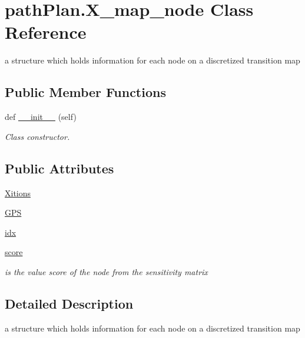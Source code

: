 \hypertarget{classpath_plan_1_1_x__map__node}{}\section{path\+Plan.\+X\+\_\+map\+\_\+node Class Reference}
\label{classpath_plan_1_1_x__map__node}


a structure which holds information for each node on a discretized transition map  


\subsection*{Public Member Functions}
\begin{DoxyCompactItemize}
\item 
def \mbox{\hyperlink{classpath_plan_1_1_x__map__node_ad8593e6f5daa3f094d7486fb158d76b3}{\+\_\+\+\_\+init\+\_\+\+\_\+}} (self)
\begin{DoxyCompactList}\small\item\em Class constructor. \end{DoxyCompactList}\end{DoxyCompactItemize}
\subsection*{Public Attributes}
\begin{DoxyCompactItemize}
\item 
\mbox{\hyperlink{classpath_plan_1_1_x__map__node_abcc46c0a97c98ba2dcf9499f36dc4a74}{Xitions}}
\item 
\mbox{\hyperlink{classpath_plan_1_1_x__map__node_a6303c4d6ec252f4b039be4c70721e432}{G\+PS}}
\item 
\mbox{\hyperlink{classpath_plan_1_1_x__map__node_a6e7953ce0421332ab2abd92c72b6b4fc}{idx}}
\item 
\mbox{\hyperlink{classpath_plan_1_1_x__map__node_a4d4c6e2da85e62606182e68fb19a22c5}{score}}
\begin{DoxyCompactList}\small\item\em is the value score of the node from the sensitivity matrix \end{DoxyCompactList}\end{DoxyCompactItemize}


\subsection{Detailed Description}
a structure which holds information for each node on a discretized transition map 

